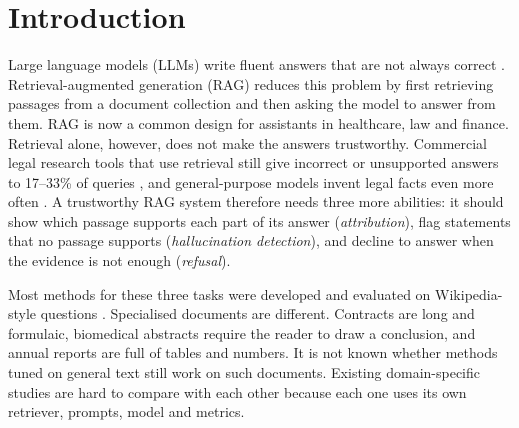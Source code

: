 \documentclass[conference]{IEEEtran}
\begin{document}
\section{Introduction}
Large language models (LLMs) write fluent answers that are not always correct \cite{ji2023survey,huang2025survey}.
Retrieval-augmented generation (RAG) \cite{lewis2020rag} reduces this problem by first retrieving passages from a document collection and then asking
the model to answer from them. RAG is now a common design for assistants in healthcare, law and finance. Retrieval alone, however, does not make the
answers trustworthy. Commercial legal research tools that use retrieval still give incorrect or unsupported answers to 17--33\% of queries
\cite{magesh2025legal}, and general-purpose models invent legal facts even more often \cite{dahl2024legal}. A trustworthy RAG system therefore needs
three more abilities: it should show which passage supports each part of its answer (\emph{attribution}), flag statements that no passage supports
(\emph{hallucination detection}), and decline to answer when the evidence is not enough (\emph{refusal}).

Most methods for these three tasks were developed and evaluated on Wikipedia-style questions
\cite{gao2023alce,song2025trust,niu2024ragtruth,joren2025sufficient}. Specialised documents are different. Contracts are long and formulaic,
biomedical abstracts require the reader to draw a conclusion, and annual reports are full of tables and numbers. It is not known whether methods
tuned on general text still work on such documents. Existing domain-specific studies are hard to compare with each other because each one uses its
own retriever, prompts, model and metrics.
\end{document}
